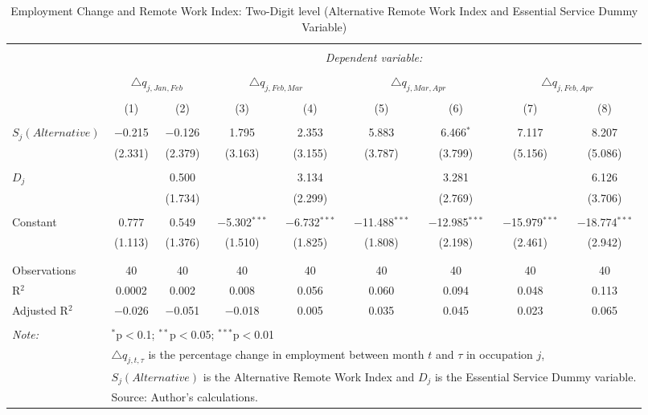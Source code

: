 
\begin{table}[!htbp] \centering 
  \caption{Employment Change and Remote Work Index: Two-Digit level (Alternative Remote Work Index and Essential Service Dummy Variable)} 
  \label{tab:regression_dynamics_2digit_alternative} 
\footnotesize 
\begin{tabular}{@{\extracolsep{5pt}}lcccccccc} 
\\[-1.8ex]\hline 
\hline \\[-1.8ex] 
 & \multicolumn{8}{c}{\textit{Dependent variable:}} \\ 
\cline{2-9} 
\\[-1.8ex] & \multicolumn{2}{c}{$\triangle q_{j,Jan,Feb}$} & \multicolumn{2}{c}{$\triangle q_{j,Feb,Mar}$} & \multicolumn{2}{c}{$\triangle q_{j,Mar,Apr}$} & \multicolumn{2}{c}{$\triangle q_{j,Feb,Apr}$} \\ 
\\[-1.8ex] & (1) & (2) & (3) & (4) & (5) & (6) & (7) & (8)\\ 
\hline \\[-1.8ex] 
 $S_{j} (Alternative)$ & $-$0.215 & $-$0.126 & 1.795 & 2.353 & 5.883 & 6.466$^{*}$ & 7.117 & 8.207 \\ 
  & (2.331) & (2.379) & (3.163) & (3.155) & (3.787) & (3.799) & (5.156) & (5.086) \\ 
  & & & & & & & & \\ 
 $D_{j}$ &  & 0.500 &  & 3.134 &  & 3.281 &  & 6.126 \\ 
  &  & (1.734) &  & (2.299) &  & (2.769) &  & (3.706) \\ 
  & & & & & & & & \\ 
 Constant & 0.777 & 0.549 & $-$5.302$^{***}$ & $-$6.732$^{***}$ & $-$11.488$^{***}$ & $-$12.985$^{***}$ & $-$15.979$^{***}$ & $-$18.774$^{***}$ \\ 
  & (1.113) & (1.376) & (1.510) & (1.825) & (1.808) & (2.198) & (2.461) & (2.942) \\ 
  & & & & & & & & \\ 
\hline \\[-1.8ex] 
Observations & 40 & 40 & 40 & 40 & 40 & 40 & 40 & 40 \\ 
R$^{2}$ & 0.0002 & 0.002 & 0.008 & 0.056 & 0.060 & 0.094 & 0.048 & 0.113 \\ 
Adjusted R$^{2}$ & $-$0.026 & $-$0.051 & $-$0.018 & 0.005 & 0.035 & 0.045 & 0.023 & 0.065 \\ 
\hline 
\hline \\[-1.8ex] 
\textit{Note:}  & \multicolumn{8}{l}{$^{*}$p$<$0.1; $^{**}$p$<$0.05; $^{***}$p$<$0.01} \\ 
 & \multicolumn{8}{l}{$\triangle q_{j,t,\tau}$ is the percentage change in employment between month $t$ and $\tau$ in occupation $j$,} \\ 
 & \multicolumn{8}{l}{$S_{j} (Alternative)$ is the Alternative Remote Work Index and $D_{j}$ is the Essential Service Dummy variable.} \\ 
 & \multicolumn{8}{l}{Source: Author's calculations.} \\ 
\end{tabular} 
\end{table} 

